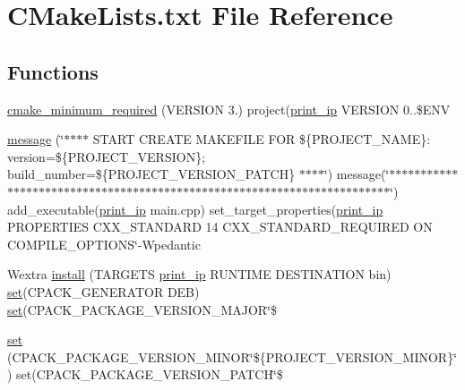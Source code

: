 \hypertarget{CMakeLists_8txt}{}\section{C\+Make\+Lists.\+txt File Reference}
\label{CMakeLists_8txt}
\subsection*{Functions}
\begin{DoxyCompactItemize}
\item 
\hyperlink{CMakeLists_8txt_a149ac2a2c7b91844a3e1b08ae0d9ed3f}{cmake\+\_\+minimum\+\_\+required} (V\+E\+R\+S\+I\+ON 3.) project(\hyperlink{main_8cpp_a4cf867f6c28bb7ed261cd61a916f029a}{print\+\_\+ip} V\+E\+R\+S\+I\+ON 0..\$E\+NV
\item 
\hyperlink{CMakeLists_8txt_ae6f32cf26d5984fc8e9e22d14fa0f1ba}{message} (\char`\"{}$\ast$$\ast$$\ast$$\ast$ S\+T\+A\+RT C\+R\+E\+A\+TE M\+A\+K\+E\+F\+I\+LE F\+OR \$\{P\+R\+O\+J\+E\+C\+T\+\_\+\+N\+A\+ME\}\+: version=\$\{P\+R\+O\+J\+E\+C\+T\+\_\+\+V\+E\+R\+S\+I\+ON\}; build\+\_\+number=\$\{P\+R\+O\+J\+E\+C\+T\+\_\+\+V\+E\+R\+S\+I\+O\+N\+\_\+\+P\+A\+T\+CH\} $\ast$$\ast$$\ast$$\ast$\char`\"{}) message(\char`\"{}$\ast$$\ast$$\ast$$\ast$$\ast$$\ast$$\ast$$\ast$$\ast$$\ast$$\ast$$\ast$$\ast$$\ast$$\ast$$\ast$$\ast$$\ast$$\ast$$\ast$$\ast$$\ast$$\ast$$\ast$$\ast$$\ast$$\ast$$\ast$$\ast$$\ast$$\ast$$\ast$$\ast$$\ast$$\ast$$\ast$$\ast$$\ast$$\ast$$\ast$$\ast$$\ast$$\ast$$\ast$$\ast$$\ast$$\ast$$\ast$$\ast$$\ast$$\ast$$\ast$$\ast$$\ast$$\ast$$\ast$$\ast$$\ast$$\ast$$\ast$$\ast$$\ast$$\ast$$\ast$$\ast$$\ast$$\ast$$\ast$$\ast$$\ast$$\ast$$\ast$\char`\"{}) add\+\_\+executable(\hyperlink{main_8cpp_a4cf867f6c28bb7ed261cd61a916f029a}{print\+\_\+ip} main.\+cpp) set\+\_\+target\+\_\+properties(\hyperlink{main_8cpp_a4cf867f6c28bb7ed261cd61a916f029a}{print\+\_\+ip} P\+R\+O\+P\+E\+R\+T\+I\+ES C\+X\+X\+\_\+\+S\+T\+A\+N\+D\+A\+RD 14 C\+X\+X\+\_\+\+S\+T\+A\+N\+D\+A\+R\+D\+\_\+\+R\+E\+Q\+U\+I\+R\+ED ON C\+O\+M\+P\+I\+L\+E\+\_\+\+O\+P\+T\+I\+O\+NS\char`\"{}-\/Wpedantic
\item 
Wextra \hyperlink{CMakeLists_8txt_ab0dd39f9d83c2d38fdca23b2a9efe293}{install} (T\+A\+R\+G\+E\+TS \hyperlink{main_8cpp_a4cf867f6c28bb7ed261cd61a916f029a}{print\+\_\+ip} R\+U\+N\+T\+I\+ME D\+E\+S\+T\+I\+N\+A\+T\+I\+ON bin) \hyperlink{CMakeLists_8txt_abed8177b0359bb37e78aebe0412cc156}{set}(C\+P\+A\+C\+K\+\_\+\+G\+E\+N\+E\+R\+A\+T\+OR D\+EB) \hyperlink{CMakeLists_8txt_abed8177b0359bb37e78aebe0412cc156}{set}(C\+P\+A\+C\+K\+\_\+\+P\+A\+C\+K\+A\+G\+E\+\_\+\+V\+E\+R\+S\+I\+O\+N\+\_\+\+M\+A\+J\+OR\char`\"{}\$
\item 
\hyperlink{CMakeLists_8txt_abed8177b0359bb37e78aebe0412cc156}{set} (C\+P\+A\+C\+K\+\_\+\+P\+A\+C\+K\+A\+G\+E\+\_\+\+V\+E\+R\+S\+I\+O\+N\+\_\+\+M\+I\+N\+OR\char`\"{}\$\{P\+R\+O\+J\+E\+C\+T\+\_\+\+V\+E\+R\+S\+I\+O\+N\+\_\+\+M\+I\+N\+OR\}\char`\"{}) set(C\+P\+A\+C\+K\+\_\+\+P\+A\+C\+K\+A\+G\+E\+\_\+\+V\+E\+R\+S\+I\+O\+N\+\_\+\+P\+A\+T\+CH\char`\"{}\$
\end{DoxyCompactItemize}
